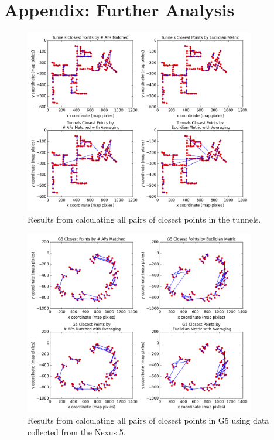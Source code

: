 \documentclass[11pt]{article}
\begin{document}
\section{Appendix: Further Analysis}
\begin{figure}[h]
\centering
\includegraphics[width=0.9\textwidth]{tunnels_togethertunnels_together_all_graphs.png}
\caption{Results from calculating all pairs of closest points in the tunnels.}
\label{fig:tunnels_all}
\end{figure}
\begin{figure}[h]
\centering
\includegraphics[width=0.9\textwidth]{nexusG5togethernexusG5together_all_graphs.png}
\caption{Results from calculating all pairs of closest points in G5 using data collected from the Nexus 5.}
\label{fig:tunnels_all}
\end{figure}
\end{document}
